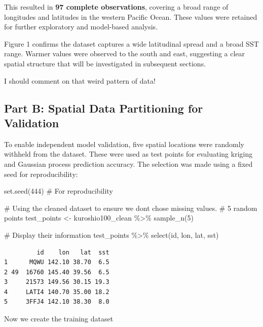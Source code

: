 \documentclass[
  11pt,
]{article}
\newenvironment{Shaded}{\begin{snugshade}}{\end{snugshade}}
\newcommand{\CommentTok}[1]{\textcolor[rgb]{0.37,0.37,0.37}{#1}}
\newcommand{\DecValTok}[1]{\textcolor[rgb]{0.68,0.00,0.00}{#1}}
\newcommand{\FunctionTok}[1]{\textcolor[rgb]{0.28,0.35,0.67}{#1}}
\newcommand{\NormalTok}[1]{\textcolor[rgb]{0.00,0.23,0.31}{#1}}
\newcommand{\OtherTok}[1]{\textcolor[rgb]{0.00,0.23,0.31}{#1}}
\newcommand{\SpecialCharTok}[1]{\textcolor[rgb]{0.37,0.37,0.37}{#1}}
\begin{document}
This resulted in \textbf{97 complete observations}, covering a broad
range of longitudes and latitudes in the western Pacific Ocean. These
values were retained for further exploratory and model-based analysis.

Figure 1 confirms the dataset captures a wide latitudinal spread and a
broad SST range. Warmer values were observed to the south and east,
suggesting a clear spatial structure that will be investigated in
subsequent sections.

I should comment on that weird pattern of data!

\subsection{Part B: Spatial Data Partitioning for
Validation}\label{part-b-spatial-data-partitioning-for-validation}

To enable independent model validation, five spatial locations were
randomly withheld from the dataset. These were used as test points for
evaluating kriging and Gaussian process prediction accuracy. The
selection was made using a fixed seed for reproducibility:

\begin{Shaded}
\begin{Highlighting}[]
\FunctionTok{set.seed}\NormalTok{(}\DecValTok{444}\NormalTok{)  }\CommentTok{\# For reproducibility}

\CommentTok{\# Using the cleaned dataset to ensure we dont chose missing values.}
\CommentTok{\# 5 random points}
\NormalTok{test\_points }\OtherTok{\textless{}{-}}\NormalTok{ kuroshio100\_clean }\SpecialCharTok{\%\textgreater{}\%}
  \FunctionTok{sample\_n}\NormalTok{(}\DecValTok{5}\NormalTok{)}

\CommentTok{\# Display their information}
\NormalTok{test\_points }\SpecialCharTok{\%\textgreater{}\%}
  \FunctionTok{select}\NormalTok{(id, lon, lat, sst)}
\end{Highlighting}
\end{Shaded}

\begin{verbatim}
         id    lon   lat  sst
1      MQWU 142.10 38.70  6.5
2 49  16760 145.40 39.56  6.5
3     21573 149.56 30.15 19.3
4     LATI4 140.70 35.00 18.2
5     3FFJ4 142.10 38.30  8.0
\end{verbatim}

Now we create the training dataset
\end{document}
